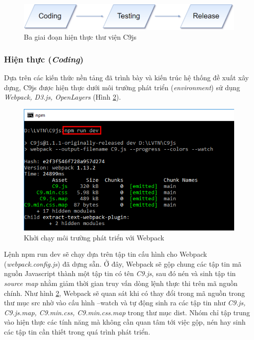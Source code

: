 \documentclass[12pt,a4paper]{article}
\begin{document}
\begin{figure}[!h]
	\begin{center}
    \includegraphics[scale=0.4]{image/implementation}
    \caption{Ba giai đoạn hiện thực thư viện C9js}
    \label{fig:implementation}
	\end{center}
\end{figure}

\subsubsection{Hiện thực (\textit{Coding})}
Dựa trên các kiến thức nền tảng đã trình bày và kiến trúc hệ thống đề xuất xây dựng, C9js được hiện thực dưới môi trường phát triển (\textit{environment}) sử dụng \textit{Webpack, D3.js, OpenLayers} (Hình \ref{fig:webpack_1}).

\begin{figure}[!h]
	\begin{center}
    \includegraphics[scale=1]{image/webpack_1}
    \caption{Khởi chạy môi trường phát triển với Webpack}
    \label{fig:webpack_1}
	\end{center}
\end{figure}

Lệnh \textsf{npm run dev} sẽ chạy dựa trên tập tin cấu hình cho Webpack (\textit{webpack.config.js}) đã dựng sẵn. Ở đây, Webpack sẽ gộp chung các tập tin mã nguồn Javascript thành một tập tin có tên \textit{C9.js}, sau đó nén và sinh tập tin \textit{source map}\cite{source_map} nhằm giảm thời gian truy vấn dòng lệnh thực thi trên mã nguồn chính. Như hình \ref{fig:webpack_1}, Webpack sẽ quan sát khi có thay đổi trong mã nguồn trong thư mục \textsf{src} nhờ vào cấu hình \textsf{--watch} và tự động sinh ra các tập tin như \textit{C9.js, C9.js.map, C9.min.css, C9.min.css.map} trong thư mục \textsf{dist}. Nhóm chỉ tập trung vào hiện thực các tính năng mà không cần quan tâm tới việc gộp, nén hay sinh các tập tin cần thiết trong quá trình phát triển.
\end{document}
